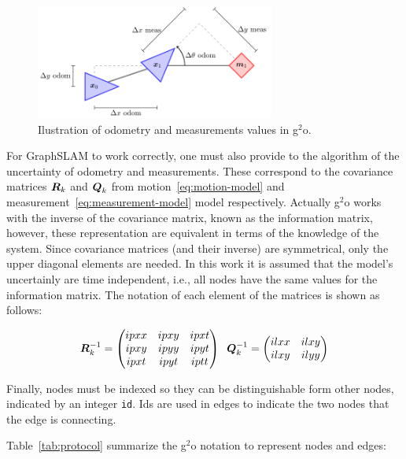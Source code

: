 \begin{figure}[htbp!]
    \centering
    \includegraphics[width=0.7\textwidth]{tikz/protocol.pdf}
    \caption{Ilustration of odometry and measurements values in g$^2$o.}
    \label{fig:protocol}
\end{figure}

For GraphSLAM to work correctly, one must also provide to the algorithm of the uncertainty of odometry and measurements. These correspond to the covariance matrices $\boldsymbol{R}_k$ and $\boldsymbol{Q}_k$ from motion~\eqref{eq:motion-model} and measurement~\eqref{eq:measurement-model} model respectively. Actually g$^2$o works with the inverse of the covariance matrix, known as the information matrix, however, these representation are equivalent in terms of the knowledge of the system. Since covariance matrices (and their inverse) are symmetrical, only the upper diagonal elements are needed. In this work it is assumed that the model's uncertainly are time independent, i.e., all nodes have the same values for the information matrix. The notation of each element of the matrices is shown as follows:

\begin{equation}
    \boldsymbol{R}^{-1}_k = \begin{pmatrix}
    ipxx & ipxy & ipxt\\
    ipxy & ipyy & ipyt\\
    ipxt & ipyt & iptt
    \end{pmatrix} \;\;
    \boldsymbol{Q}^{-1}_k = \begin{pmatrix}
    ilxx & ilxy\\
    ilxy & ilyy
    \end{pmatrix} 
\end{equation}

Finally, nodes must be indexed so they can be distinguishable form other nodes, indicated by an integer \texttt{id}. Ids are used in edges to indicate the two nodes that the edge is connecting.

Table~\ref{tab:protocol} summarize the g$^2$o notation to represent nodes and edges:

